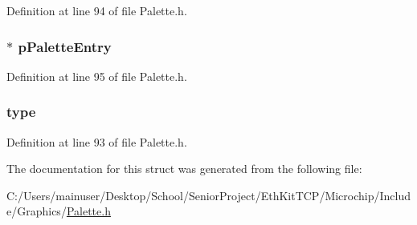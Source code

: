 Definition at line 94 of file Palette.\+h.

\hypertarget{struct_p_a_l_e_t_t_e___f_l_a_s_h_a4f405f95a6b502c1b6ba3fbb17b18631}{}
\subsubsection[{p\+Palette\+Entry}]{$\ast$ p\+Palette\+Entry}\label{struct_p_a_l_e_t_t_e___f_l_a_s_h_a4f405f95a6b502c1b6ba3fbb17b18631}


Definition at line 95 of file Palette.\+h.

\hypertarget{struct_p_a_l_e_t_t_e___f_l_a_s_h_a06d50a20f32a049972021c00b4ced77d}{}
\subsubsection[{type}]{ type}\label{struct_p_a_l_e_t_t_e___f_l_a_s_h_a06d50a20f32a049972021c00b4ced77d}


Definition at line 93 of file Palette.\+h.



The documentation for this struct was generated from the following file\+:\begin{DoxyCompactItemize}
\item 
C\+:/\+Users/mainuser/\+Desktop/\+School/\+Senior\+Project/\+Eth\+Kit\+T\+C\+P/\+Microchip/\+Include/\+Graphics/\hyperlink{_palette_8h}{Palette.\+h}\end{DoxyCompactItemize}
